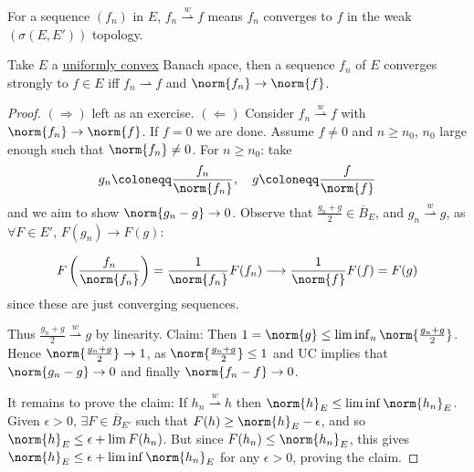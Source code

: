 \documentclass[twoside]{article}
\newcommand{\weakconv}{\overset{w}{\rightharpoonup}}
\begin{document}
\begin{notation}
    For a sequence $(f_n)$ in $E$, $f_n \weakconv f$ means $f_n$ converges to $f$ in the weak $(\sigma(E, E'))$ topology.
\end{notation}
\begin{prop}
    Take $E$ a \hyperlink{def:uc}{uniformly convex} Banach space, then a sequence $f_n$ of $E$ converges strongly to $f \in E$ iff $f_n \rightharpoonup f$ and $\norm{f_n} \to \norm{f}$.
\end{prop}
\begin{proof}
    $(\Rightarrow)$ left as an exercise.
    $(\Leftarrow)$ Consider $f_n \weakconv f$ with $\norm{f_n} \to \norm{f}$. If $f = 0$ we are done. Assume $f \neq 0$ and $ n \geq n_0$, $n_0$ large enough such that $\norm{f_n} \neq 0$.
    For $n \geq n_0$: take
    \begin{equation*}
        g_n \coloneqq \frac{f_n}{\norm{f_n}}, \quad g \coloneqq \frac{f}{\norm{f}}
    \end{equation*}
    and we aim to show $\norm{g_n - g} \to 0$.
    Observe that $\frac{g_n + g}{2} \in \overline{B}_E$, and $g_n \weakconv g$, as $\forall F \in E'$, $F(g_n) \to F(g)$:

    \begin{equation*}
        F\left(\frac{f_n}{\norm{f_n}}\right) = \frac{1}{\norm{f_n}} F(f_n) \longrightarrow \frac{1}{\norm{f}} F(f) = F(g)
    \end{equation*}
    since these are just converging sequences.

    Thus $\frac{g_n + g}{2} \weakconv g$ by linearity.
    Claim: Then $1=\norm{g} \leq \liminf_{n} \norm{\frac{g_n + g}{2}}$.
    Hence $\norm{\frac{g_n+g}{2}} \to 1$, as $\norm{\frac{g_n+g}{2}} \leq 1$ and UC implies that $\norm{g_n - g} \to 0$ and finally $\norm{f_n - f} \to 0$.

    It remains to prove the claim: If $h_n \weakconv h$ then $\norm{h}_E \leq \liminf \norm{h_n}_E$.
    Given $\epsilon > 0$, $\exists F \in \overline{B}_{E'}$ such that $F(h) \geq \norm{h}_E - \epsilon$, and so $\norm{h}_E \leq \epsilon + \lim F(h_n)$.
    But since $F(h_n) \leq \norm{h_n}_E$, this gives $\norm{h}_E \leq \epsilon + \liminf \norm{h_n}_E$ for any $\epsilon > 0$, proving the claim.
\end{proof}

\clearpage
\end{document}

